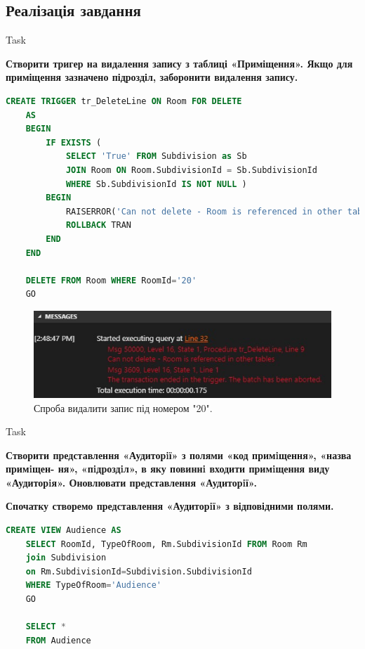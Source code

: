 \documentclass[a4paper,12pt]{article}
\newcommand{\RomanNumeralCaps}[1]{\MakeUppercase{\romannumeral #1}}
\begin{document}
\newpage
	\begin{center}
		\section*{\bfseries{Реалізація завдання}}
	\end{center}
    \begin{center}
        \Large{Task \RomanNumeralCaps{1}}
    \end{center}
    \textbf{Створити тригер на видалення запису з таблиці «Приміщення». Якщо для приміщення зазначено підрозділ, заборонити видалення запису.}
	\begin{lstlisting}[language=SQL]
	CREATE TRIGGER tr_DeleteLine ON Room FOR DELETE
	AS
	BEGIN
		IF EXISTS (
			SELECT 'True' FROM Subdivision as Sb
			JOIN Room ON Room.SubdivisionId = Sb.SubdivisionId
			WHERE Sb.SubdivisionId IS NOT NULL )
		BEGIN 
			RAISERROR('Can not delete - Room is referenced in other tables', 16, 1)
			ROLLBACK TRAN
		END
	END
	
	DELETE FROM Room WHERE RoomId='20'
	GO
	\end{lstlisting}
	\begin{figure}[h!]
		\begin{minipage}[h]{1\linewidth}
			\centering
			\includegraphics[width=0.6\linewidth]{Prt sc/Figure_1.jpg}  
		\end{minipage}
		\caption{Спроба видалити запис під номером "20".}
	\end{figure}
	
	\begin{center}
        \Large{Task \RomanNumeralCaps{2}}
    \end{center}
	\textbf{Створити представлення «Аудиторiї» з полями «код примiщення», «назва примiщен-
	ня», «пiдроздiл», в яку повиннi входити примiщення виду «Аудиторiя». Оновлювати
	представлення «Аудиторiї».} 
	\begin{center}
		\textbf{Спочатку створемо представлення «Аудиторiї» з відповідними полями.}
	\end{center}
	\begin{lstlisting}[language=SQL]
	CREATE VIEW Audience AS
	SELECT RoomId, TypeOfRoom, Rm.SubdivisionId FROM Room Rm
	join Subdivision
	on Rm.SubdivisionId=Subdivision.SubdivisionId
	WHERE TypeOfRoom='Audience'
	GO
	
	SELECT *
	FROM Audience
	\end{lstlisting}
\end{document}
